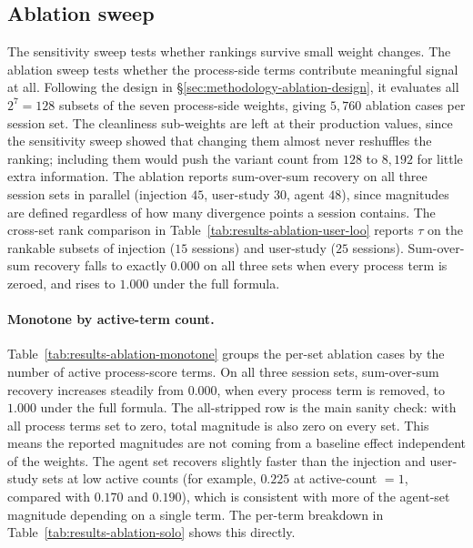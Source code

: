 \subsection{Ablation sweep}
\label{sec:results-ablation}

The sensitivity sweep tests whether rankings survive small weight changes. The ablation sweep tests whether the process-side terms contribute meaningful signal at all. Following the design in \S\ref{sec:methodology-ablation-design}, it evaluates all $2^7 = 128$ subsets of the seven process-side weights, giving $5{,}760$ ablation cases per session set. The cleanliness sub-weights are left at their production values, since the sensitivity sweep showed that changing them almost never reshuffles the ranking; including them would push the variant count from $128$ to $8{,}192$ for little extra information. The ablation reports sum-over-sum recovery on all three session sets in parallel (injection $45$, user-study $30$, agent $48$), since magnitudes are defined regardless of how many divergence points a session contains. The cross-set rank comparison in Table~\ref{tab:results-ablation-user-loo} reports $\tau$ on the rankable subsets of injection ($15$ sessions) and user-study ($25$ sessions). Sum-over-sum recovery falls to exactly $0.000$ on all three sets when every process term is zeroed, and rises to $1.000$ under the full formula.

\paragraph{Monotone by active-term count.}
Table~\ref{tab:results-ablation-monotone} groups the per-set ablation cases by the number of active process-score terms. On all three session sets, sum-over-sum recovery increases steadily from $0.000$, when every process term is removed, to $1.000$ under the full formula. The all-stripped row is the main sanity check: with all process terms set to zero, total magnitude is also zero on every set. This means the reported magnitudes are not coming from a baseline effect independent of the weights. The agent set recovers slightly faster than the injection and user-study sets at low active counts (for example, $0.225$ at active-count $= 1$, compared with $0.170$ and $0.190$), which is consistent with more of the agent-set magnitude depending on a single term. The per-term breakdown in Table~\ref{tab:results-ablation-solo} shows this directly.


